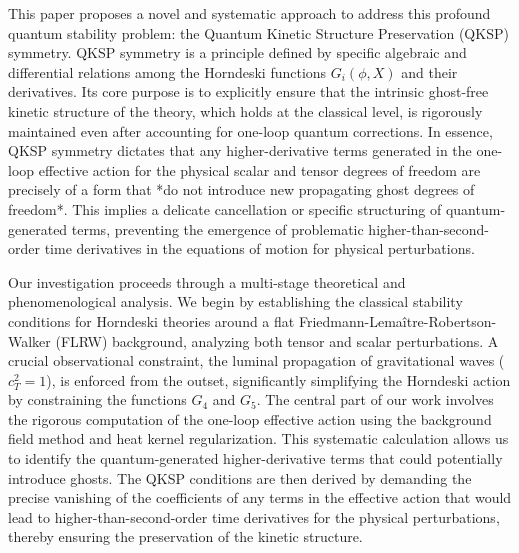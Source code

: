 \documentclass[twocolumn]{aastex631}
\begin{document}
This paper proposes a novel and systematic approach to address this profound quantum stability problem: the Quantum Kinetic Structure Preservation (QKSP) symmetry. QKSP symmetry is a principle defined by specific algebraic and differential relations among the Horndeski functions $G_i(\phi, X)$ and their derivatives. Its core purpose is to explicitly ensure that the intrinsic ghost-free kinetic structure of the theory, which holds at the classical level, is rigorously maintained even after accounting for one-loop quantum corrections. In essence, QKSP symmetry dictates that any higher-derivative terms generated in the one-loop effective action for the physical scalar and tensor degrees of freedom are precisely of a form that *do not introduce new propagating ghost degrees of freedom*. This implies a delicate cancellation or specific structuring of quantum-generated terms, preventing the emergence of problematic higher-than-second-order time derivatives in the equations of motion for physical perturbations.

Our investigation proceeds through a multi-stage theoretical and phenomenological analysis. We begin by establishing the classical stability conditions for Horndeski theories around a flat Friedmann-Lemaître-Robertson-Walker (FLRW) background, analyzing both tensor and scalar perturbations. A crucial observational constraint, the luminal propagation of gravitational waves ($c_T^2=1$), is enforced from the outset, significantly simplifying the Horndeski action by constraining the functions $G_4$ and $G_5$. The central part of our work involves the rigorous computation of the one-loop effective action using the background field method and heat kernel regularization. This systematic calculation allows us to identify the quantum-generated higher-derivative terms that could potentially introduce ghosts. The QKSP conditions are then derived by demanding the precise vanishing of the coefficients of any terms in the effective action that would lead to higher-than-second-order time derivatives for the physical perturbations, thereby ensuring the preservation of the kinetic structure.
\end{document}
